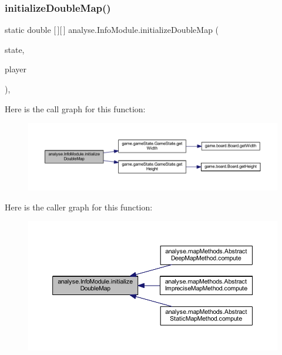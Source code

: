 \subsubsection{\texorpdfstring{initialize\+Double\+Map()}{initializeDoubleMap()}}
{\footnotesize\ttfamily static double \mbox{[}$\,$\mbox{]}\mbox{[}$\,$\mbox{]} analyse.\+Info\+Module.\+initialize\+Double\+Map (\begin{DoxyParamCaption}\item[{\mbox{\hyperlink{classgame_1_1game_state_1_1_game_state}{Game\+State}}}]{state,  }\item[{\mbox{\hyperlink{enumgame_1_1_e_player}{E\+Player}}}]{player }\end{DoxyParamCaption})\hspace{0.3cm}{\ttfamily [inline]}, {\ttfamily [static]}}

Here is the call graph for this function\+:
\nopagebreak
\begin{figure}[H]
\begin{center}
\leavevmode
\includegraphics[width=350pt]{classanalyse_1_1_info_module_a0693c1b360ceaad897107c41bddb1576_cgraph}
\end{center}
\end{figure}
Here is the caller graph for this function\+:
\nopagebreak
\begin{figure}[H]
\begin{center}
\leavevmode
\includegraphics[width=350pt]{classanalyse_1_1_info_module_a0693c1b360ceaad897107c41bddb1576_icgraph}
\end{center}
\end{figure}


